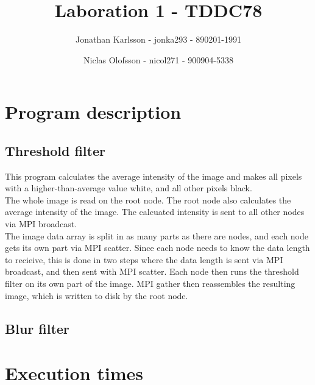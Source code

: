 \documentclass[a4paper]{article}
\author{Jonathan Karlsson - jonka293 - 890201-1991 \and Niclas Olofsson - nicol271 - 900904-5338}
\title{Laboration 1 - TDDC78}
\begin{document}
\maketitle

\section{Program description}
\subsection{Threshold filter}

This program calculates the average intensity of the image and makes all
pixels with a higher-than-average value white, and all other pixels
black.\\

The whole image is read on the root node. The root node also calculates
the  average intensity of the image. The calcuated intensity is sent to
all other nodes via MPI broadcast.\\

The image data array is split in as many parts as there are nodes, and
each node gets its own part via MPI scatter. Since each node needs to
know  the data length to recieive, this is done in two steps where the
data length is  sent via MPI broadcast, and then sent with MPI scatter.
Each node then runs the threshold filter on its own part of the image.
MPI gather then reassembles the resulting image, which is written to
disk by the root node.\\

\subsection{Blur filter}

\section{Execution times}
\end{document}

